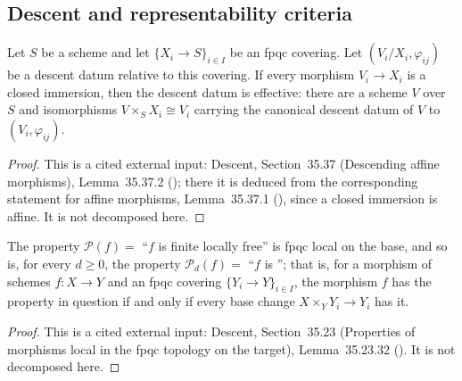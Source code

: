 \subsection{Descent and representability criteria}

\begin{lemma}
\label{lem:pc-effective-descent-closed-immersions}
Let $S$ be a scheme and let $\{X_i\to S\}_{i\in I}$ be an fpqc covering.  Let
$(V_i/X_i,\varphi_{ij})$ be a descent datum relative to this covering.  If every morphism
$V_i\to X_i$ is a closed immersion, then the descent datum is effective: there are a scheme
$V$ over $S$ and isomorphisms $V\times_SX_i\cong V_i$ carrying the canonical descent datum of
$V$ to $(V_i,\varphi_{ij})$.
\end{lemma}
\begin{proof}
This is a cited external input: Descent, Section~35.37 (Descending affine morphisms),
Lemma~35.37.2 (); there it is deduced from the corresponding statement for
affine morphisms, Lemma~35.37.1 (), since a closed immersion is affine.  It is not decomposed
here.
\end{proof}

\begin{lemma}
\label{lem:pc-flf-fpqc-local}
The property $\mathcal P(f)=$ ``$f$ is finite locally free'' is fpqc local on the base, and so
is, for every $d\geq0$, the property $\mathcal P_d(f)=$ ``$f$ is
''; that is, for a
morphism of schemes $f:X\to Y$ and an fpqc covering $\{Y_i\to Y\}_{i\in I}$, the morphism $f$
has the property in question if and only if every base change $X\times_YY_i\to Y_i$ has it.
\end{lemma}
\begin{proof}
This is a cited external input: Descent, Section~35.23 (Properties of morphisms local in the
fpqc topology on the target), Lemma~35.23.32 ().  It is not decomposed
here.
\end{proof}

